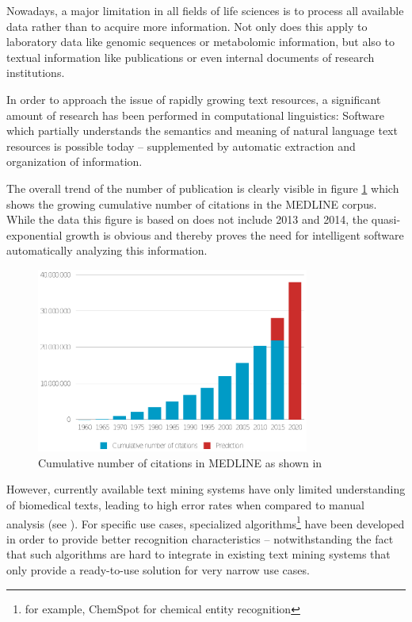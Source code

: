 \documentclass[a4paper, 12pt, twoside, reqn]{report}
\numberwithin{figure}{chapter}
\newtheorem[L]{boxedDefinition}{Definition}
\newtheorem[L]{boxedExample}{Example}
\begin{document}
Nowadays, a major limitation in all fields of life sciences is to process all available data rather than to acquire more information. Not only does this apply to laboratory data like genomic sequences or metabolomic information, but also to textual information like publications or even internal documents of research institutions.

In order to approach the issue of rapidly growing text resources, a significant amount of research has been performed in computational linguistics: Software which partially understands the semantics and meaning of natural language text resources is possible today -- supplemented by automatic extraction and organization of information.

The overall trend of the number of publication is clearly visible in figure \ref{fig:citations} which shows the growing cumulative number of citations in the MEDLINE corpus. While the data this figure is based on does not include 2013 and 2014, the quasi-exponential growth is obvious and thereby proves the need for intelligent software automatically analyzing this information.

\begin{figure}[!htb]
  \centering
  \includegraphics[width=0.8\textwidth]{Figures/Fig1.eps}
  \caption[Cumulative number of MEDLINE citations]{Cumulative number of citations in MEDLINE as shown in \cite[figure 1.1]{wachinger2013next}}
  \label{fig:citations}
\end{figure}

However, currently available text mining systems have only limited understanding of biomedical texts, leading to high error rates when compared to manual analysis (see \cite{rebholz2005facts}). For specific use cases, specialized algorithms\footnote{for example, ChemSpot \cite{rocktaschel2012chemspot} for chemical entity recognition} have been developed in order to provide better recognition characteristics -- notwithstanding the fact that such algorithms are hard to integrate in existing text mining systems that only provide a ready-to-use solution for very narrow use cases.
\end{document}

